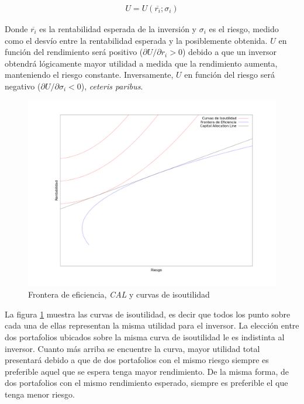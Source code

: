 \begin{align}
	U = U(\overline{r_i} ; \sigma_i) \label{funcionutilidad}
\end{align}

Donde $\overline{r_i}$ es la rentabilidad esperada de la inversión y $\sigma_i$ es el riesgo, medido como el desvío entre la rentabilidad esperada y la posiblemente obtenida. $U$ en función del rendimiento será positivo ($\partial U/\partial r_i > 0$) debido a que un inversor obtendrá lógicamente mayor utilidad a medida que la rendimiento aumenta, manteniendo el riesgo constante. Inversamente, $U$ en función del riesgo será negativo ($\partial U/\partial \sigma_i < 0$), \textit{ceteris paribus}.

\begin{figure}[H]
\centering
\includegraphics[width=1\textwidth]{Images/capm.png}
\caption{Frontera de eficiencia, \textit{CAL} y curvas de isoutilidad}
\label{fig:frontef}
\end{figure}

La figura \ref{fig:frontef} muestra las curvas de isoutilidad, es decir que todos los punto sobre cada una de ellas representan la misma utilidad para el inversor. La elección entre dos portafolios ubicados sobre la misma curva de isoutilidad le es indistinta al inversor. Cuanto más arriba se encuentre la curva, mayor utilidad total presentará debido a que de dos portafolios con el mismo riesgo siempre es preferible aquel que se espera tenga mayor rendimiento. De la misma forma, de dos portafolios con el mismo rendimiento esperado, siempre es preferible el que tenga menor riesgo.

